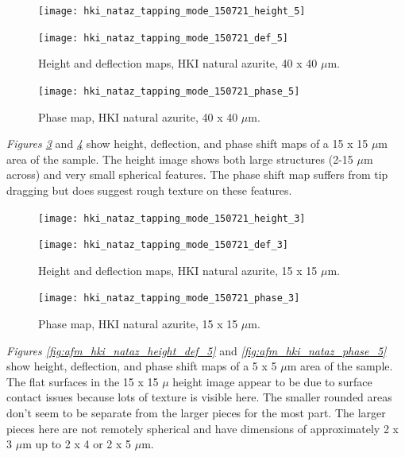 \begin{figure}[H]
\centering
\begin{minipage}{.45\textwidth}
  \centering
  \texttt{[image: hki\_nataz\_tapping\_mode\_150721\_height\_5]}
\end{minipage}
\begin{minipage}{.45\textwidth}
  \centering
  \texttt{[image: hki\_nataz\_tapping\_mode\_150721\_def\_5]}
\end{minipage}
\caption[Height and deflection maps, HKI natural azurite]{Height and deflection maps, HKI natural azurite, 40 x 40 $\mu$m.}
\label{fig:afm_hki_nataz_height_def_3}
\end{figure}

\begin{figure}[H]
\centering
  \texttt{[image: hki\_nataz\_tapping\_mode\_150721\_phase\_5]}
\caption[Phase map, HKI natural azurite]{Phase map, HKI natural azurite, 40 x 40 $\mu$m.}
\label{fig:afm_hki_nataz_phase_3}
\end{figure}

\textit{Figures \ref{fig:afm_hki_nataz_height_def_4}} and \textit{\ref{fig:afm_hki_nataz_phase_4}} show height, deflection, and phase shift maps of a 15 x 15 $\mu$m area of the sample. The height image shows both large structures (2-15 $\mu$m across) and very small spherical features. The phase shift map suffers from tip dragging but does suggest rough texture on these features.

\begin{figure}[H]
\centering
\begin{minipage}{.45\textwidth}
  \centering
  \texttt{[image: hki\_nataz\_tapping\_mode\_150721\_height\_3]}
\end{minipage}
\begin{minipage}{.45\textwidth}
  \centering
  \texttt{[image: hki\_nataz\_tapping\_mode\_150721\_def\_3]}
\end{minipage}
\caption[Height and deflection maps, HKI natural azurite]{Height and deflection maps, HKI natural azurite, 15 x 15 $\mu$m.}
\label{fig:afm_hki_nataz_height_def_4}
\end{figure}

\begin{figure}[H]
\centering
  \texttt{[image: hki\_nataz\_tapping\_mode\_150721\_phase\_3]}
\caption[Phase map, HKI natural azurite]{Phase map, HKI natural azurite, 15 x 15 $\mu$m.}
\label{fig:afm_hki_nataz_phase_4}
\end{figure}

\textit{Figures \ref{fig:afm_hki_nataz_height_def_5}} and \textit{\ref{fig:afm_hki_nataz_phase_5}} show height, deflection, and phase shift maps of a 5 x 5 $\mu$m area of the sample. The flat surfaces in the 15 x 15 $\mu$ height image appear to be due to surface contact issues because lots of texture is visible here. The smaller rounded areas don’t seem to be separate from the larger pieces for the most part. The larger pieces here are not remotely spherical and have dimensions of approximately 2 x 3 $\mu$m up to 2 x 4 or 2 x 5 $\mu$m.

